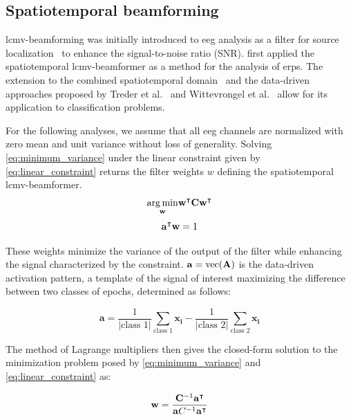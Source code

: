 	\subsection{Spatiotemporal beamforming}
  \ac{lcmv}-beamforming was initially introduced to \ac{eeg} analysis as a filter for
	source localization~\cite{VanVeen1997} to enhance the signal-to-noise ratio
	(SNR).
	\textcite{VanVliet2015} first applied the spatiotemporal
	\ac{lcmv}-beamformer as a method for the analysis of \acp{erp}.
	The extension to the combined spatiotemporal domain~\cite{VanVliet2015} and the
	data-driven approaches proposed by Treder et al.~\cite{Treder2016} and
	Wittevrongel et al.~\cite{Wittevrongel2016} allow for its application to classification problems.

	For the following analyses, we assume that all \ac{eeg} channels are normalized with zero mean and unit variance without loss of generality.
	Solving \cref{eq:minimum_variance} under the linear constraint given by
	\cref{eq:linear_constraint} returns the filter weights $w$ defining the spatiotemporal \ac{lcmv}-beamformer.
	\begin{equation}
    \underset{\mathbf{w}}{\arg\min}\mathbf{w}^\intercal \mathbf{C}
		\mathbf{w}^\intercal
		\label{eq:minimum_variance}
	\end{equation}
	\begin{equation}
		\mathbf{a}^\intercal\mathbf{w} = 1
		\label{eq:linear_constraint}
	\end{equation}

	These weights minimize the variance of the output of the filter while enhancing
	the signal characterized by the constraint.
  $\mathbf{a} = \text{vec}(\mathbf{A})$ is the data-driven activation pattern, a template
	of the signal of interest maximizing the difference between two classes of
	epochs, determined as follows:

	\begin{equation}
		\mathbf{a} =
		\frac{1}{|\text{class 1}|}\sum_\text{class 1}\mathbf{x_i} -
		\frac{1}{|\text{class 2}|}\sum_\text{class 2}\mathbf{x_i}
		\label{eq:activation_pattern}
	\end{equation}

	The method of Lagrange multipliers then gives the closed-form solution to the minimization problem posed by
	\cref{eq:minimum_variance} and \cref{eq:linear_constraint} as:

	\begin{equation}
		\mathbf{w} =
    \frac{\mathbf{C}^{-1}\mathbf{a}^\intercal}
		{\mathbf{a}C^{-1}\mathbf{a}^\intercal}
		\label{eq:closed_form}
	\end{equation}



